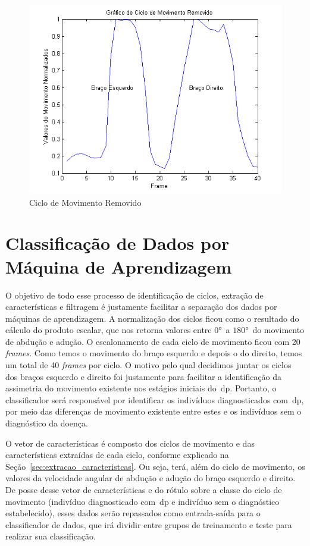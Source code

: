 \begin{figure}[!htb]
     \centering
     \includegraphics[width=1\textwidth]{./img/ciclomovimentoremovido.png}
     \caption{Ciclo de Movimento Removido}
		 \label{img:ciclo_filtrado}
\end{figure}


\section{Classificação de Dados por Máquina de Aprendizagem}\label{section:class_dados}
O objetivo de todo esse processo de identificação de ciclos, extração de características e filtragem é justamente facilitar a separação dos dados por máquinas de aprendizagem. A normalização dos ciclos ficou como o resultado do cálculo do produto escalar, que nos retorna valores entre $ 0° $\ a $ 180° $\, do movimento de abdução e adução. O escalonamento de cada ciclo de movimento ficou com 20 \textit{frames}. Como temos o movimento do braço esquerdo e depois o do direito, temos um total de 40 \textit{frames} por ciclo. O motivo pelo qual decidimos juntar os ciclos dos braços esquerdo e direito foi justamente para facilitar a identificação da assimetria do movimento existente nos estágios iniciais do~\ac{dp}. Portanto, o classificador será responsável por identificar os indivíduos diagnosticados com~\ac{dp}, por meio das diferenças de movimento existente entre estes e os indivíduos sem o diagnóstico da doença. 

O vetor de características é composto dos ciclos de movimento e das características extraídas de cada ciclo, conforme explicado na Seção~\ref{sec:extracao_caracteristcas}. Ou seja, terá, além do ciclo de movimento, os valores da velocidade angular de abdução e adução do braço esquerdo e direito. De posse desse vetor de características e do rótulo sobre a classe do ciclo de movimento (indivíduo diagnosticado com~\ac{dp} e indivíduo sem o diagnóstico estabelecido), esses dados serão repassados como entrada-saída para o classificador de dados, que irá dividir entre grupos de treinamento e teste para realizar sua classificação.

